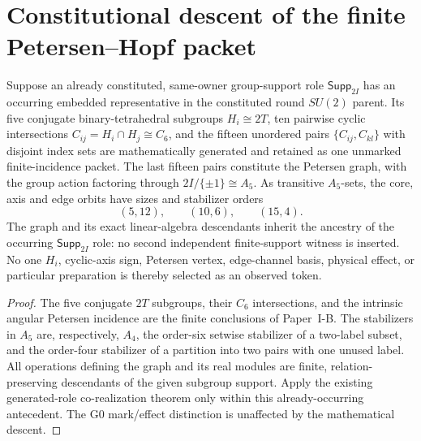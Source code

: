 \documentclass[12pt,a4paper]{article}
\begin{document}
\section{Constitutional descent of the finite Petersen--Hopf packet}
\label{p2a:sec:v318-petersen-constitution}

\begin{theorem}
\label{p2a:thm:v318-petersen-same-owner-descent}
Suppose an already constituted, same-owner group-support role
$\mathsf{Supp}_{2I}$ has an occurring embedded representative in the
constituted round $SU(2)$ parent.  Its five conjugate binary-tetrahedral
subgroups $H_i\cong2T$, ten pairwise cyclic intersections
$C_{ij}=H_i\cap H_j\cong C_6$, and the fifteen unordered pairs
$\{C_{ij},C_{kl}\}$ with disjoint index sets are mathematically generated
and retained as one unmarked finite-incidence packet.  The last fifteen
pairs constitute the Petersen graph, with the group action factoring
through $2I/\{\pm1\}\cong A_5$.  As transitive $A_5$-sets, the core,
axis and edge orbits have sizes and stabilizer orders
\[
  (5,12),\qquad(10,6),\qquad(15,4).
\]
The graph and its exact linear-algebra descendants inherit the ancestry
of the occurring $\mathsf{Supp}_{2I}$ role: no second independent
finite-support witness is inserted.  No one $H_i$, cyclic-axis sign,
Petersen vertex, edge-channel basis, physical effect, or particular
preparation is thereby selected as an observed token.
\end{theorem}
\begin{proof}
The five conjugate $2T$ subgroups, their $C_6$ intersections, and the
intrinsic angular Petersen incidence are the finite conclusions of
Paper~I-B.  The stabilizers in $A_5$ are, respectively, $A_4$, the
order-six setwise stabilizer of a two-label subset, and the order-four
stabilizer of a partition into two pairs with one unused label.
All operations defining the graph and its real modules are finite,
relation-preserving descendants of the given subgroup support.  Apply
the existing generated-role co-realization theorem only within this
already-occurring antecedent.  The G0 mark/effect distinction is
unaffected by the mathematical descent.
\end{proof}
\end{document}
